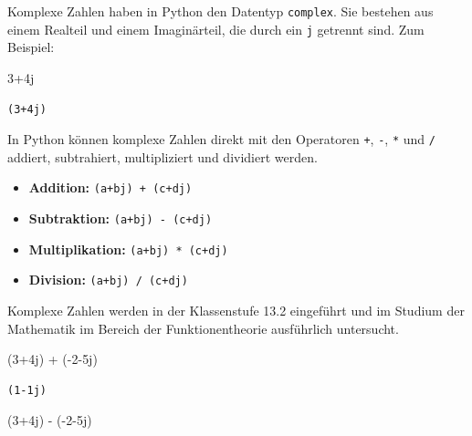 \documentclass[
  11pt,
  a4paper,
  DIV=11,
  numbers=noendperiod]{scrartcl}
\newenvironment{Shaded}{\begin{snugshade}}{\end{snugshade}}
\newcommand{\DecValTok}[1]{\textcolor[rgb]{0.68,0.00,0.00}{#1}}
\newcommand{\NormalTok}[1]{\textcolor[rgb]{0.00,0.23,0.31}{#1}}
\newcommand{\OperatorTok}[1]{\textcolor[rgb]{0.37,0.37,0.37}{#1}}
\newcommand{\OtherTok}[1]{\textcolor[rgb]{0.00,0.23,0.31}{#1}}
\providecommand{\tightlist}{%
  \setlength{\itemsep}{0pt}\setlength{\parskip}{0pt}}\usepackage{longtable,booktabs,array}
\begin{document}
Komplexe Zahlen haben in Python den Datentyp \texttt{complex}. Sie
bestehen aus einem Realteil und einem Imaginärteil, die durch ein
\texttt{j} getrennt sind. Zum Beispiel:

\begin{Shaded}
\begin{Highlighting}[numbers=left,,]
\DecValTok{3}\OperatorTok{+}\OtherTok{4j}
\end{Highlighting}
\end{Shaded}

\begin{verbatim}
(3+4j)
\end{verbatim}

In Python können komplexe Zahlen direkt mit den Operatoren \texttt{+},
\texttt{-}, \texttt{*} und \texttt{/} addiert, subtrahiert,
multipliziert und dividiert werden.

\begin{itemize}
\tightlist
\item
  \textbf{Addition:} \texttt{(a+bj)\ +\ (c+dj)}
\item
  \textbf{Subtraktion:} \texttt{(a+bj)\ -\ (c+dj)}
\item
  \textbf{Multiplikation:} \texttt{(a+bj)\ *\ (c+dj)}
\item
  \textbf{Division:} \texttt{(a+bj)\ /\ (c+dj)}
\end{itemize}

Komplexe Zahlen werden in der Klassenstufe 13.2 eingeführt und im
Studium der Mathematik im Bereich der Funktionentheorie ausführlich
untersucht.

\begin{Shaded}
\begin{Highlighting}[numbers=left,,]
\NormalTok{(}\DecValTok{3}\OperatorTok{+}\OtherTok{4j}\NormalTok{) }\OperatorTok{+}\NormalTok{ (}\OperatorTok{{-}}\DecValTok{2}\OperatorTok{{-}}\OtherTok{5j}\NormalTok{)}
\end{Highlighting}
\end{Shaded}

\begin{verbatim}
(1-1j)
\end{verbatim}

\begin{Shaded}
\begin{Highlighting}[numbers=left,,]
\NormalTok{(}\DecValTok{3}\OperatorTok{+}\OtherTok{4j}\NormalTok{) }\OperatorTok{{-}}\NormalTok{ (}\OperatorTok{{-}}\DecValTok{2}\OperatorTok{{-}}\OtherTok{5j}\NormalTok{)}
\end{Highlighting}
\end{Shaded}
\end{document}
